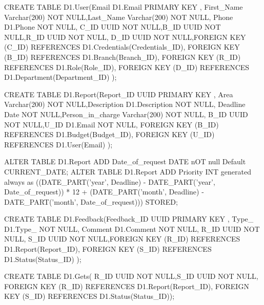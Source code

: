 CREATE TABLE D1.User(Email D1.Email PRIMARY KEY ,
                     First_Name Varchar(200) NOT NULL,Last_Name Varchar(200) NOT NULL,
                     Phone D1.Phone NOT NULL, C_ID UUID NOT NULL,B_ID UUID NOT NULL,R_ID UUID NOT NULL,
                     D_ID UUID NOT NULL,FOREIGN KEY (C_ID) REFERENCES D1.Credentials(Credentials_ID),
                     FOREIGN KEY (B_ID) REFERENCES D1.Branch(Branch_ID),
                     FOREIGN KEY (R_ID) REFERENCES D1.Role(Role_ID),
                     FOREIGN KEY (D_ID) REFERENCES D1.Department(Department_ID) );

CREATE TABLE D1.Report(Report_ID UUID PRIMARY KEY ,
                       Area Varchar(200) NOT NULL,Description D1.Description NOT NULL,
                       Deadline Date NOT NULL,Person_in_charge Varchar(200) NOT NULL,
                       B_ID UUID NOT NULL,U_ID D1.Email NOT NULL,
                       FOREIGN KEY (B_ID) REFERENCES D1.Budget(Budget_ID),
                       FOREIGN KEY (U_ID) REFERENCES D1.User(Email) );


ALTER TABLE D1.Report ADD Date_of_request DATE nOT null Default CURRENT_DATE;
ALTER TABLE D1.Report ADD Priority INT generated always as  ((DATE_PART('year', Deadline) - DATE_PART('year', Date_of_request)) * 12 + (DATE_PART('month', Deadline) - DATE_PART('month', Date_of_request)))  STORED;

CREATE TABLE D1.Feedback(Feedback_ID UUID PRIMARY KEY ,
                         Type_ D1.Type_ NOT NULL, Comment D1.Comment NOT NULL,
                         R_ID UUID NOT NULL,
                         S_ID UUID NOT NULL,FOREIGN KEY (R_ID) REFERENCES D1.Report(Report_ID),
                         FOREIGN KEY (S_ID) REFERENCES D1.Status(Status_ID) );

CREATE TABLE D1.Gets( R_ID UUID NOT NULL,S_ID UUID NOT NULL,
                      FOREIGN KEY (R_ID) REFERENCES D1.Report(Report_ID),
                      FOREIGN KEY (S_ID) REFERENCES D1.Status(Status_ID)); 


